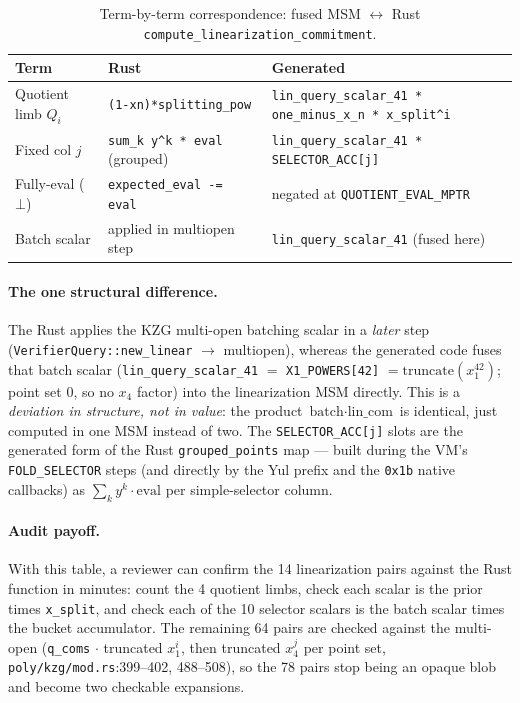 \begin{table}[h]
\centering\footnotesize
\begin{tabular}{@{}p{5.6em}p{9.8em}p{10.2em}@{}}
\toprule
\textbf{Term} & \textbf{Rust} & \textbf{Generated} \\
\midrule
Quotient limb $Q_i$ &
  \texttt{(1-xn)*\allowbreak{}splitting\_pow} &
  \texttt{lin\_query\_scalar\_41\allowbreak{} *\allowbreak{} one\_minus\_x\_n\allowbreak{} *\allowbreak{} x\_split\textasciicircum i} \\
Fixed col $j$ &
  \texttt{sum\_\allowbreak{}k y\textasciicircum k * eval} (grouped) &
  \texttt{lin\_query\_scalar\_41\allowbreak{} *\allowbreak{} SELECTOR\_ACC[j]} \\
Fully-eval ($\bot$) &
  \texttt{expected\_\allowbreak{}eval -= eval} &
  negated at \texttt{QUOTIENT\_\allowbreak{}EVAL\_\allowbreak{}MPTR} \\
Batch scalar &
  applied in multiopen step &
  \texttt{lin\_\allowbreak{}query\_\allowbreak{}scalar\_\allowbreak{}41} (fused here) \\
\bottomrule
\end{tabular}
\caption{Term-by-term correspondence: fused MSM $\leftrightarrow$ Rust
\texttt{compute\_\allowbreak{}linearization\_\allowbreak{}commitment}.}
\end{table}

\paragraph{The one structural difference.} The Rust applies the KZG
multi-open batching scalar in a \emph{later} step
(\texttt{VerifierQuery::new\_\allowbreak{}linear} $\to$ multiopen), whereas the
generated code fuses that batch scalar (\texttt{lin\_\allowbreak{}query\_\allowbreak{}scalar\_\allowbreak{}41}
$=$ \texttt{X1\_POWERS[42]} $=\mathrm{truncate}(x_1^{42})$; point set 0,
so no $x_4$ factor) into the linearization MSM directly. This is a
\emph{deviation in structure, not in value}: the product
$\text{batch} \cdot \text{lin\_com}$ is identical, just computed in one
MSM instead of two. The \texttt{SELECTOR\_ACC[j]} slots are the
generated form of the Rust \texttt{grouped\_points} map --- built during
the VM's \texttt{FOLD\_SELECTOR} steps (and directly by the Yul prefix and
the \texttt{0x1b} native callbacks) as $\sum_k y^k \cdot \text{eval}$
per simple-selector column.

\paragraph{Audit payoff.} With this table, a reviewer can confirm the
14 linearization pairs against the Rust function in minutes: count the
4 quotient limbs, check each scalar is the prior times \texttt{x\_split},
and check each of the 10 selector scalars is the batch scalar times the
bucket accumulator. The remaining 64 pairs are checked against the
multi-open (\texttt{q\_coms} $\cdot$ truncated $x_1^i$, then truncated
$x_4^j$ per point set, \texttt{poly/kzg/mod.rs}:399--402, 488--508), so
the 78 pairs stop being an opaque blob and become two checkable
expansions.

